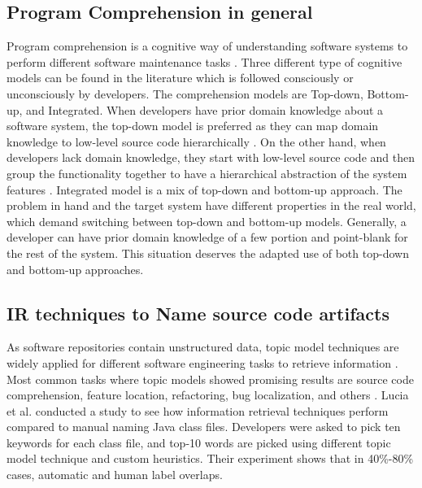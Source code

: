 \subsection{Program Comprehension in general}
Program comprehension is a cognitive way of understanding software systems to perform different software maintenance tasks \cite{wei2002surveyCategorizationComprehension, siegmund2016programPastFuture}. Three different type of cognitive models \cite{tilley1998reverseEngineeringFramework, von1993programToolRequirements, siegmund2016programPastFuture} can be found in the literature which is followed consciously or unconsciously by developers. The comprehension models are Top-down, Bottom-up, and Integrated. When developers have prior domain knowledge about a software system, the top-down model is preferred as they can map domain knowledge to low-level source code hierarchically \cite{brooks1983theoryComprehensionPrograms}. On the other hand, when developers lack domain knowledge, they start with low-level source code and then group the functionality together to have a hierarchical abstraction of the system features \cite{shneiderman1979syntacticInteractionsModel, pennington1987stimulusMentalRepresentations}. Integrated model \cite{shaft1995relevanceDomainKnowledge, von1993programToolRequirements} is a mix of top-down and bottom-up approach. The problem in hand and the target system have different properties in the real world, which demand switching between top-down and bottom-up models. Generally, a developer can have prior domain knowledge of a few portion and point-blank for the rest of the system. This situation deserves the adapted use of both top-down and bottom-up approaches.   


\subsection{IR techniques to Name source code artifacts}
As software repositories contain unstructured data, topic model techniques are widely applied for different software engineering tasks to retrieve information \cite{chen2016topicMiningRepositories, panichella2013topicModelsTasks, sun2016surveyTopicSE}. Most common tasks where topic models showed promising results are source code comprehension, feature location, refactoring, bug localization, and others \cite{sun2016surveyTopicSE}. Lucia et al. \cite{de2012IRMethodsArtifacts} conducted a study to see how information retrieval techniques perform compared to manual naming Java class files. Developers were asked to pick ten keywords for each class file, and top-10 words are picked using different topic model technique and custom heuristics. Their experiment shows that in 40\%-80\% cases, automatic and human label overlaps. 

